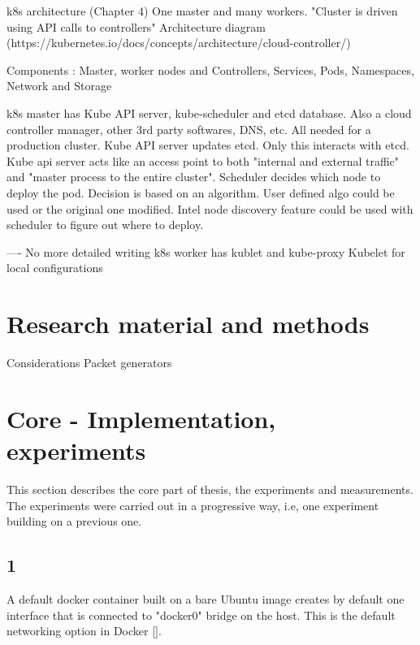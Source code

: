 \documentclass[english, 12pt, a4paper, elec, utf8, a-1b, online]{aaltothesis}
\begin{document}
k8s architecture (Chapter 4)
One master and many workers. "Cluster is driven using API calls to controllers" Architecture diagram (https://kubernetes.io/docs/concepts/architecture/cloud-controller/)

Components : Master, worker nodes and Controllers, Services, Pods, Namespaces, Network and Storage

k8s master has Kube API server, kube-scheduler and etcd database.
Also a cloud controller manager, other 3rd party softwares, DNS, etc. All needed for a production cluster. Kube API server updates etcd. Only this interacts with etcd.
Kube api server acts like an access point to both "internal and external traffic" and "master process to the entire cluster".
Scheduler decides which node to deploy the pod. Decision is  based on an algorithm. User defined algo could be used or the original one modified. Intel node discovery feature could be used with scheduler to figure out where to deploy.

---- No more detailed writing
k8s worker has kublet and kube-proxy
Kubelet for local configurations

\clearpage
\section{Research material and methods}
Considerations
		Packet generators
\clearpage
\section{Core - Implementation, experiments}
This section describes the core part of thesis, the experiments and measurements. The experiments were carried out in a progressive way, i.e, one experiment building on a previous one. 


\subsection{1}
A default docker container built on a bare Ubuntu image creates by default one interface that is connected to "docker0" bridge on the host. This is the default networking option in Docker []. 
\end{document}
